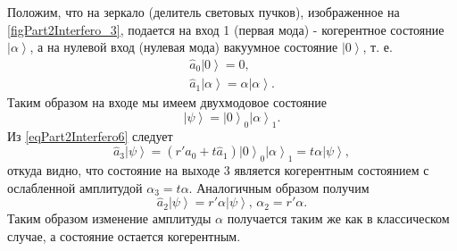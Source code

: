 

Положим, что на зеркало (делитель световых пучков), изображенное на
\autoref{figPart2Interfero_3}, подается на вход 1 (первая мода) -
когерентное состояние $\left|\alpha\right>$, а на нулевой вход
(нулевая мода) вакуумное состояние $\left|0\right>$, т. е.
\begin{eqnarray}
\hat{a}_0 \left|0\right> = 0,
\nonumber \\
\hat{a}_1 \left|\alpha\right> = \alpha \left|\alpha\right>.
\nonumber
\end{eqnarray}
Таким образом на входе мы имеем двухмодовое состояние 
\[
\left|\psi\right> = \left|0\right>_0 \left|\alpha\right>_1.
\]
Из \eqref{eqPart2Interfero6} следует 
\begin{equation}
\hat{a}_3\left|\psi\right> = 
\left(r' \hat{a}_0 + t \hat{a}_1\right)\left|0\right>_0
\left|\alpha\right>_1 = 
t \alpha \left|\psi\right>,
\nonumber
\end{equation}
откуда видно, что состояние на выходе 3 является когерентным состоянием
с ослабленной амплитудой $\alpha_3 = t \alpha$. 
Аналогичным образом получим
\begin{equation}
\hat{a}_2\left|\psi\right> = 
r' \alpha \left|\psi\right>, \, \alpha_2 = r'\alpha.
\label{eqPart2InterferoTask3}
\end{equation}
Таким образом изменение амплитуды $\alpha$ получается таким же как в
классическом случае, а состояние остается когерентным.

